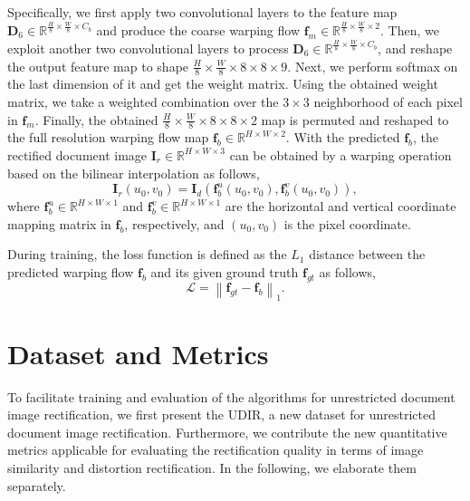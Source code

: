 \documentclass[lettersize,journal]{IEEEtran}
\begin{document}
Specifically, we first apply two convolutional layers to the feature map $\bm{D}_6 \in \mathbb{R}^{\frac{H}{8} \times \frac{W}{8} \times C_b}$ and produce the coarse warping flow 
$\bm{f}_m \in \mathbb{R}^{\frac{H}{8}\times \frac{W}{8}\times 2}$.
Then, we exploit another two convolutional layers to process $\bm{D}_6 \in \mathbb{R}^{\frac{H}{8} \times \frac{W}{8} \times C_b}$, and reshape the output feature map to shape $\frac{H}{8} \times \frac{W}{8} \times 8\times8\times9$.
Next, we perform softmax on the last dimension of it and get the weight matrix.
Using the obtained weight matrix, we take a weighted combination over the $3\times3$ neighborhood of each pixel in $\bm{f}_m$.
Finally, the obtained $\frac{H}{8} \times \frac{W}{8} \times 8\times8 \times 2$ map is permuted and reshaped to the full resolution warping flow map $\bm{f}_b \in \mathbb{R}^{H \times W \times 2}$.
With the predicted $\bm{f}_b$, the rectified document image $\bm{I}_r\in\mathbb{R}^{H\times W\times 3}$ can be obtained by a warping operation based on the bilinear interpolation as follows,
\begin{equation}\label{equ:task}
	\bm{I}_r(u_0,v_0) = \bm{I}_d(\bm{f}_b^{u}(u_0,v_0), \bm{f}_b^{v}(u_0,v_0)),
\end{equation}
where $\bm{f}_b^{u} \in \mathbb{R}^{H \times W \times 1}$ and $\bm{f}_b^{v} \in \mathbb{R}^{H \times W \times 1}$ are the horizontal and vertical coordinate mapping matrix in $\bm{f}_b$, respectively, and $(u_{0},v_{0})$ is the pixel coordinate.

During training, the loss function is defined as the $L_1$ distance between the predicted warping flow $\bm{f}_b$ and its given ground truth $\bm{f}_{gt}$ as follows,
\begin{equation}
	\mathcal{L} = \left \| \bm{f}_{gt} - \bm{f}_b \right \|_1.
\end{equation}





\section{Dataset and Metrics}
To facilitate training and evaluation of the algorithms for unrestricted document image rectification, we first present the UDIR, 
a new dataset for unrestricted document image rectification.
Furthermore, we contribute the new quantitative metrics applicable for evaluating the rectification quality in terms of image similarity and distortion rectification.
In the following, we elaborate them separately.
\end{document}
